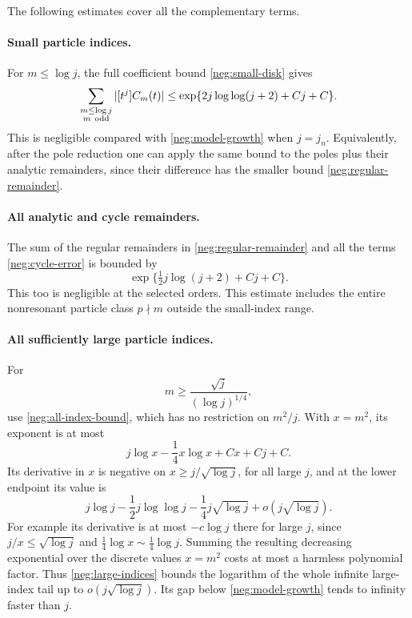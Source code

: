 \documentclass[11pt]{article}
\numberwithin{equation}{section}
\theoremstyle{definition}
\begin{document}
The following estimates cover all the complementary terms.

\paragraph{Small particle indices.}
For \(m\le\log j\), the full coefficient bound
\eqref{neg:small-disk} gives
\begin{equation}
 \sum_{\substack{m\le\log j\\m\ {\rm odd}}}
       |[t^j]C_m(t)|
 \le \exp\{2j\log\log(j+2)+Cj+C\}.
 \label{neg:small-indices}
\end{equation}
This is negligible compared with \eqref{neg:model-growth}
when \(j=j_n\).  Equivalently, after the pole reduction one
can apply the same bound to the poles plus their analytic
remainders, since their difference has the smaller bound
\eqref{neg:regular-remainder}.

\paragraph{All analytic and cycle remainders.}
The sum of the regular remainders in
\eqref{neg:regular-remainder} and all the terms
\eqref{neg:cycle-error} is bounded by
\begin{equation}
 \exp\{\tfrac12j\log(j+2)+Cj+C\}.
 \label{neg:all-remainders}
\end{equation}
This too is negligible at the selected orders.  This estimate
includes the entire nonresonant particle class \(p\nmid m\)
outside the small-index range.

\paragraph{All sufficiently large particle indices.}
For
\[
 m\ge\frac{\sqrt j}{(\log j)^{1/4}},
 \]
use \eqref{neg:all-index-bound}, which has no restriction
on \(m^2/j\).  With \(x=m^2\), its exponent is at most
\[
 j\log x-\frac14x\log x+Cx+Cj+C .
 \]
Its derivative in \(x\) is negative on
\(x\ge j/\sqrt{\log j}\), for all large \(j\), and at the
lower endpoint its value is
\begin{equation}
 j\log j-\frac12j\log\log j
            -\frac14j\sqrt{\log j}
            +o(j\sqrt{\log j}).
 \label{neg:large-indices}
\end{equation}
For example its derivative is at most \(-c\log j\)
there for large \(j\), since
\(j/x\le\sqrt{\log j}\) and
\(\tfrac14\log x\sim\tfrac14\log j\).
Summing the resulting decreasing exponential over the
discrete values \(x=m^2\) costs at most a harmless polynomial
factor.  Thus \eqref{neg:large-indices} bounds the logarithm
of the whole infinite large-index tail up to
\(o(j\sqrt{\log j})\).
Its gap below \eqref{neg:model-growth} tends to infinity
faster than \(j\).
\end{document}
